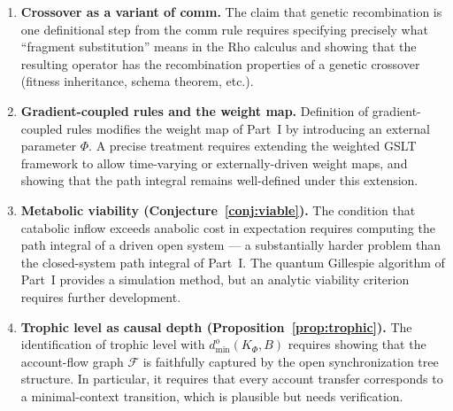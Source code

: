 \begin{enumerate}[label=\textbf{Gap \arabic*.}, leftmargin=*, itemsep=8pt]
  \item \textbf{Crossover as a variant of comm.}
        The claim that genetic recombination is one definitional
        step from the comm rule requires specifying precisely what
        ``fragment substitution'' means in the Rho calculus and
        showing that the resulting operator has the recombination
        properties of a genetic crossover (fitness inheritance,
        schema theorem, etc.).

  \item \textbf{Gradient-coupled rules and the weight map.}
        Definition of gradient-coupled rules modifies the weight
        map of Part~I by introducing an external parameter $\Phi$.
        A precise treatment requires extending the weighted GSLT
        framework to allow time-varying or externally-driven weight
        maps, and showing that the path integral remains
        well-defined under this extension.

  \item \textbf{Metabolic viability (Conjecture~\ref{conj:viable}).}
        The condition that catabolic inflow exceeds anabolic cost
        in expectation requires computing the path integral of a
        driven open system --- a substantially harder problem than
        the closed-system path integral of Part~I.
        The quantum Gillespie algorithm of Part~I provides a
        simulation method, but an analytic viability criterion
        requires further development.

  \item \textbf{Trophic level as causal depth
        (Proposition~\ref{prop:trophic}).}
        The identification of trophic level with
        $d^o_{\min}(K_\Phi, B)$ requires showing that the
        account-flow graph $\mathcal{F}$ is faithfully captured
        by the open synchronization tree structure.
        In particular, it requires that every account transfer
        corresponds to a minimal-context transition, which is
        plausible but needs verification.

\end{enumerate}

